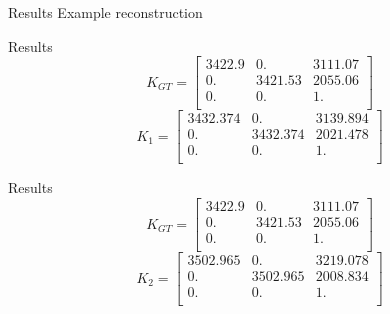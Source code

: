 \documentclass{beamer}
\begin{document}
\begin{frame}{Results}
Example reconstruction
\end{frame}

{
	\begin{frame}[plain]
	\end{frame}
}

\begin{frame}{Results}
\[
K_{GT} = 
\begin{bmatrix}
3422.9  &   0.  & 3111.07 \\
0.   & 3421.53 & 2055.06\\
0.    & 0. &     1.  \\
\end{bmatrix}
\]
\[
K_{1} = 
\begin{bmatrix}
3432.374   & 0.    & 3139.894\\
0. & 3432.374 & 2021.478\\
0.    & 0. &     1.  \\
\end{bmatrix}
\]
\end{frame}

{
	\begin{frame}[plain]
	\end{frame}
}

\begin{frame}{Results}
	\[
	K_{GT} = 
	\begin{bmatrix}
	3422.9  &   0.  & 3111.07 \\
	0.   & 3421.53 & 2055.06\\
	0.    & 0. &     1.  \\
	\end{bmatrix}
	\]
	\[
	K_{2} = 
	\begin{bmatrix}
	
	3502.965 & 0.  &  3219.078 \\
	0. &  3502.965 & 2008.834 \\
	0.    & 0. &     1.  \\
	\end{bmatrix}
	\]
\end{frame}
\end{document}
